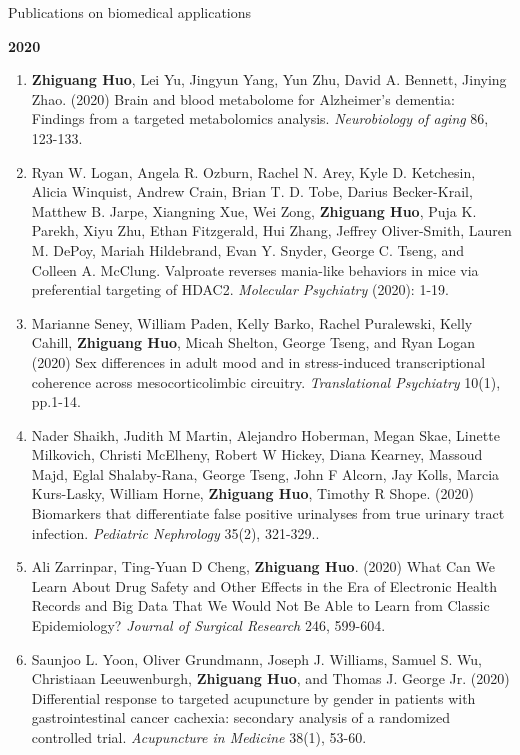 \documentclass{resume} %
\begin{document}
\begin{rSection}{Publications on biomedical applications}
\begin{enumerate}[noitemsep,topsep=0pt, resume]
\end{enumerate}


\textbf{2020}
\begin{enumerate}[noitemsep,topsep=0pt, resume]

\item  {\bf Zhiguang Huo}, Lei Yu, Jingyun Yang, Yun Zhu,  David A. Bennett, Jinying Zhao. (2020)
Brain and blood metabolome for Alzheimer's dementia: Findings from a targeted metabolomics analysis.
\emph{Neurobiology of aging}  86, 123-133.

\item
Ryan W. Logan, Angela R. Ozburn, Rachel N. Arey, Kyle D. Ketchesin, Alicia Winquist, Andrew Crain, Brian T. D. Tobe, Darius Becker-Krail, Matthew B. Jarpe, Xiangning Xue, Wei Zong, {\bf Zhiguang Huo}, Puja K. Parekh, Xiyu Zhu, Ethan Fitzgerald, Hui Zhang, Jeffrey Oliver-Smith, Lauren M. DePoy, Mariah Hildebrand, Evan Y. Snyder, George C. Tseng, and Colleen A. McClung. 
Valproate reverses mania-like behaviors in mice via preferential targeting of HDAC2.
\emph{Molecular Psychiatry} (2020): 1-19.

\item 
Marianne Seney, William Paden, Kelly Barko, Rachel Puralewski, Kelly Cahill, {\bf Zhiguang Huo}, Micah Shelton, George Tseng, and Ryan Logan
(2020)
Sex differences in adult mood and in stress-induced transcriptional coherence across mesocorticolimbic circuitry.
\emph{Translational Psychiatry}  10(1), pp.1-14.

\item
Nader Shaikh, Judith M Martin, Alejandro Hoberman, Megan Skae, Linette Milkovich, Christi McElheny, Robert W Hickey, Diana Kearney, Massoud Majd, Eglal Shalaby-Rana, George Tseng, John F Alcorn, Jay Kolls, Marcia Kurs-Lasky, William Horne, {\bf Zhiguang Huo}, Timothy R Shope.  (2020)
Biomarkers that differentiate false positive urinalyses from true urinary tract infection. 
\emph{Pediatric Nephrology}  35(2), 321-329..



\item
Ali Zarrinpar,  Ting-Yuan D Cheng, {\bf Zhiguang Huo}. (2020)
What Can We Learn About Drug Safety and Other Effects in the Era of Electronic Health Records and Big Data That We Would Not Be Able to Learn from Classic Epidemiology?
\emph{Journal of Surgical Research} 246, 599-604.

\item 
Saunjoo L. Yoon, Oliver Grundmann, Joseph J. Williams, Samuel S. Wu, Christiaan Leeuwenburgh, {\bf Zhiguang Huo}, and Thomas J. George Jr. (2020)
Differential response to targeted acupuncture by gender in patients with gastrointestinal cancer cachexia: secondary analysis of a randomized controlled trial.
\emph{Acupuncture in Medicine}  38(1), 53-60.


\end{enumerate}
\end{rSection}
\end{document}
